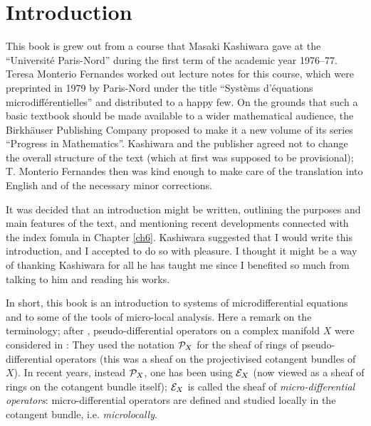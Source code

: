 \chapter{Introduction}

This book is grew out from a course that 
Masaki Kashiwara gave at the ``Universit\'e Paris-Nord'' 
during the first term of the academic year 1976--77. 
Teresa Monterio Fernandes worked out lecture notes for 
this course, which were preprinted in 1979 by Paris-Nord 
under the title ``Syst\`ems d'\'equations 
microdiff\'erentielles'' and distributed to a happy few. 
On the grounds that such a basic textbook 
should be made available to a wider mathematical audience, 
the Birkh\"auser Publishing Company proposed to make it 
a new volume of its series ``Progress in Mathematics''. 
Kashiwara and the publisher agreed not to change the overall 
structure of the text (which at first 
was supposed to be provisional); T. Monterio Fernandes then 
was kind enough to make care of the translation into English 
and of the necessary minor corrections. 

It was decided that an introduction might be written, outlining 
the purposes and main features of the text, and mentioning 
recent developments connected with the index fomula in Chapter \ref{ch6}. 
Kashiwara suggested that I would write this introduction, 
and I accepted to do so with pleasure. 
I thought it might be a way of thanking Kashiwara for 
all he has taught me since I benefited so much from 
talking to him and reading his works. 

In short, this book is an introduction to systems of 
microdifferential equations and to some of the tools 
of micro-local analysis. 
Here a remark on the terminology; after \cite{BK76}, 
pseudo-differential operators on a complex manifold \(X\) 
were considered in \cite{SKK}: 
They used the notation \(\mathcal{P}_X\) for the sheaf of rings 
of pseudo-differential operators (this was a sheaf on the 
projectivised cotangent bundles of \(X\)). 
In recent years, instead \(\mathcal{P}_X\), 
one has been using \(\mathcal{E}_X\) (now viewed as a sheaf of rings 
on the cotangent bundle itself); \(\mathcal{E}_X\) is called 
the sheaf of \emph{micro-differential operators}: 
micro-differential operators are defined and studied 
locally in the cotangent bundle, i.e. \emph{microlocally}. 


